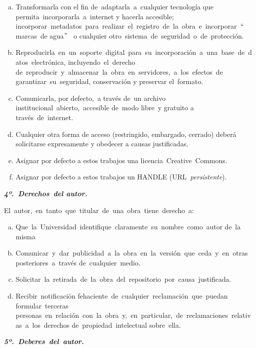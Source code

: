 \begin{enumerate}[(a)]
	\item Transformarla con el fin de adaptarla a cualquier tecnología que permita incorporarla a internet y hacerla accesible; incorporar metadatos para realizar el registro de la obra e incorporar $``$marcas de agua$"$  o cualquier otro sistema de seguridad o de protección. 
	\item Reproducirla en un soporte digital para su incorporación a una base de datos electrónica, incluyendo el derecho de reproducir y almacenar la obra en servidores, a los efectos de garantizar su seguridad, conservación y preservar el formato.
	\item  Comunicarla, por defecto, a través de un archivo institucional abierto, accesible de modo libre y gratuito a través de internet. 
	\item Cualquier otra forma de acceso (restringido, embargado, cerrado) deberá solicitarse expresamente y obedecer a causas justificadas.
	\item  Asignar por defecto a estos trabajos una licencia Creative Commons. 
	\item Asignar por defecto a estos trabajos un HANDLE (URL \textit{persistente}).
\end{enumerate}

\vspace*{1em}
\textbf{\textit{4º. Derechos del autor.}}
\vspace*{1em}

El autor, en tanto que titular de una obra tiene derecho a: 

\begin{enumerate}[(a)]
	\item  Que la Universidad identifique claramente su nombre como autor de la misma 
	\item  Comunicar y dar publicidad a la obra en la versión que ceda y en otras posteriores a través de cualquier medio. 
	\item  Solicitar la retirada de la obra del repositorio por causa justificada.  
	\item  Recibir notificación fehaciente de cualquier reclamación que puedan formular terceras personas en relación con la obra y, en particular, de reclamaciones relativas a los derechos de propiedad intelectual sobre ella. 
\end{enumerate}

\vspace*{1em}
\textbf{\textit{5º. Deberes del autor.}} 
\vspace*{1em}

